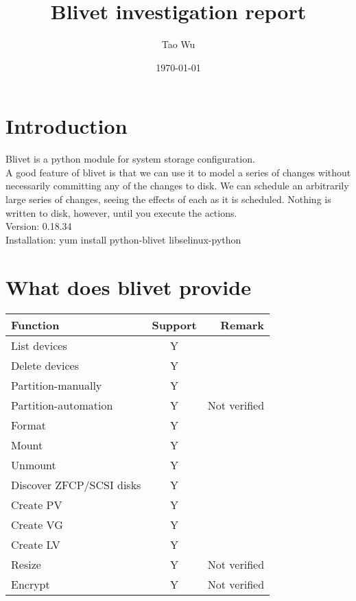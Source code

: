 \documentclass{article}
\begin{document}
\title{\textbf{Blivet investigation report}}
\author{Tao Wu}
\date{\today}
\maketitle
\section{Introduction}

Blivet is a python module for system storage configuration.\\

A good feature of blivet is that we can use it to model a series of changes
without necessarily committing any of the changes to disk. We can schedule an
arbitrarily large series of changes, seeing the effects of each as it is
scheduled. Nothing is written to disk, however, until you execute the actions.\\

Version: 0.18.34 \\

Installation:  yum install python-blivet libselinux-python\\
\section{What does blivet provide}
\begin{tabular}{|l|c|r|}
\hline
Function & Support & Remark\\
\hline
List devices & Y & \\
Delete devices & Y & \\
Partition-manually & Y & \\
Partition-automation & Y & Not verified\\
Format & Y & \\
Mount & Y & \\
Unmount & Y & \\
Discover ZFCP/SCSI disks & Y & \\
Create PV & Y & \\
Create VG & Y & \\
Create LV & Y & \\
Resize & Y & Not verified\\
Encrypt & Y & Not verified\\
\hline
\end{tabular}\\
\clearpage
\end{document}
